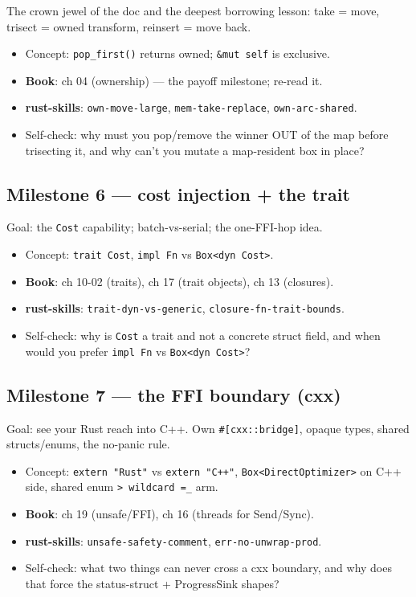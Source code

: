 \documentclass[11pt]{article}
\begin{document}
The crown jewel of the doc and the deepest borrowing lesson: take = move,
trisect = owned transform, reinsert = move back.

\begin{itemize}
\item Concept: \texttt{pop\_first()} returns owned; \texttt{\&mut self} is exclusive.
\item \textbf{\textbf{Book}}: ch 04 (ownership) — the payoff milestone; re-read it.
\item \textbf{\textbf{rust-skills}}: \texttt{own-move-large}, \texttt{mem-take-replace}, \texttt{own-arc-shared}.
\item Self-check: why must you pop/remove the winner OUT of the map before
trisecting it, and why can't you mutate a map-resident box in place?
\end{itemize}
\subsection{Milestone 6 — cost injection + the trait}
\label{sec:orgaa54efa}

Goal: the \texttt{Cost} capability; batch-vs-serial; the one-FFI-hop idea.

\begin{itemize}
\item Concept: \texttt{trait Cost}, \texttt{impl Fn} vs \texttt{Box<dyn Cost>}.
\item \textbf{\textbf{Book}}: ch 10-02 (traits), ch 17 (trait objects), ch 13 (closures).
\item \textbf{\textbf{rust-skills}}: \texttt{trait-dyn-vs-generic}, \texttt{closure-fn-trait-bounds}.
\item Self-check: why is \texttt{Cost} a trait and not a concrete struct field, and when
would you prefer \texttt{impl Fn} vs \texttt{Box<dyn Cost>}?
\end{itemize}
\subsection{Milestone 7 — the FFI boundary (cxx)}
\label{sec:org20d1bae}

Goal: see your Rust reach into C++. Own \texttt{\#[cxx::bridge]}, opaque types, shared
structs/enums, the no-panic rule.

\begin{itemize}
\item Concept: \texttt{extern "Rust"} vs \texttt{extern "C++"}, \texttt{Box<DirectOptimizer>} on C++ side,
shared enum \texttt{> wildcard =\_} arm.
\item \textbf{\textbf{Book}}: ch 19 (unsafe/FFI), ch 16 (threads for Send/Sync).
\item \textbf{\textbf{rust-skills}}: \texttt{unsafe-safety-comment}, \texttt{err-no-unwrap-prod}.
\item Self-check: what two things can never cross a cxx boundary, and why does that
force the status-struct + ProgressSink shapes?
\end{itemize}
\end{document}
